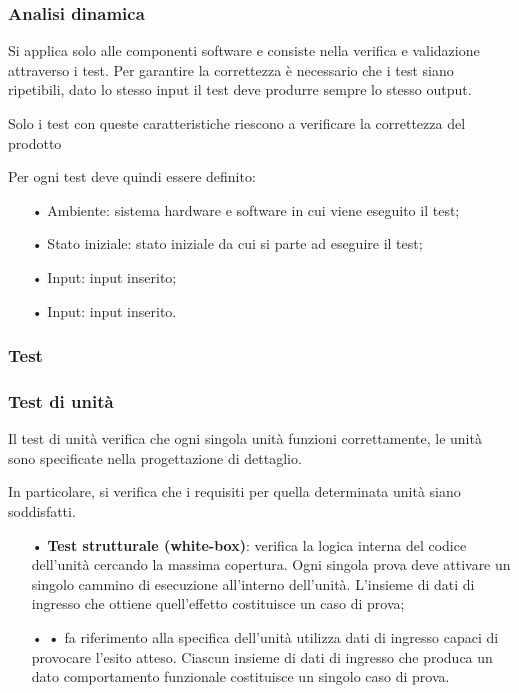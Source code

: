 \subsubsection{Analisi dinamica}
Si applica solo alle componenti software e consiste nella verifica e validazione attraverso i test. Per garantire la correttezza è necessario che i test siano ripetibili, dato lo stesso input il test deve produrre sempre lo stesso output.  

Solo i test con queste caratteristiche riescono a verificare la correttezza del prodotto 

Per ogni test deve quindi essere definito: 
\begin{itemize}
\item[•] Ambiente: sistema hardware e software in cui viene eseguito il test; 
\item[•]Stato iniziale: stato iniziale da cui si parte ad eseguire il test; 
\item[•] Input: input inserito;
\item[•] Input: input inserito.
\end{itemize}

\subsubsection{Test}

\subsubsection{Test di unità}
Il test di unità verifica che ogni singola unità funzioni correttamente, le unità sono specificate nella progettazione di dettaglio.  

In particolare, si verifica che i requisiti per quella determinata unità siano soddisfatti.
\begin{itemize}
\item[•] \textbf{Test strutturale (white-box)}: verifica la logica interna del codice dell’unità cercando la massima copertura. Ogni singola prova deve attivare un singolo cammino di esecuzione all’interno dell’unità. L’insieme di dati di ingresso che ottiene quell’effetto costituisce un caso di prova;
\item[•] \textbf{•} fa riferimento alla specifica dell’unità utilizza dati di ingresso capaci di provocare l’esito atteso. Ciascun insieme di dati di ingresso che produca un dato comportamento funzionale costituisce un singolo caso di prova.
\end{itemize}

